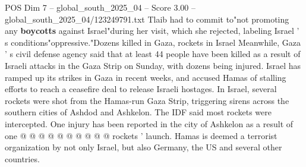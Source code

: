 \begin{textsample}{POS Dim 7 – global\_south\_2025\_04 – Score 3.00 – global\_south\_2025\_04/123249791.txt}
Tlaib had to commit to"not promoting any \textbf{boycotts} against Israel"during her visit, which she rejected, labeling Israel ' s conditions"oppressive."Dozens killed in Gaza, rockets in Israel Meanwhile, Gaza ' s civil defense agency said that at least 44 people have been killed as a result of Israeli attacks in the Gaza Strip on Sunday, with dozens being injured.
Israel has ramped up its strikes in Gaza in recent weeks, and accused Hamas of stalling efforts to reach a ceasefire deal to release Israeli hostages.
In Israel, several rockets were shot from the Hamas-run Gaza Strip, triggering sirens across the southern cities of Ashdod and Ashkelon.
The IDF said most rockets were intercepted.
One injury has been reported in the city of Ashkelon as a result of one @ @ @ @ @ @ @ @ @ @ rockets ' launch.
Hamas is deemed a terrorist organization by not only Israel, but also Germany, the US and several other countries.

\end{textsample}
